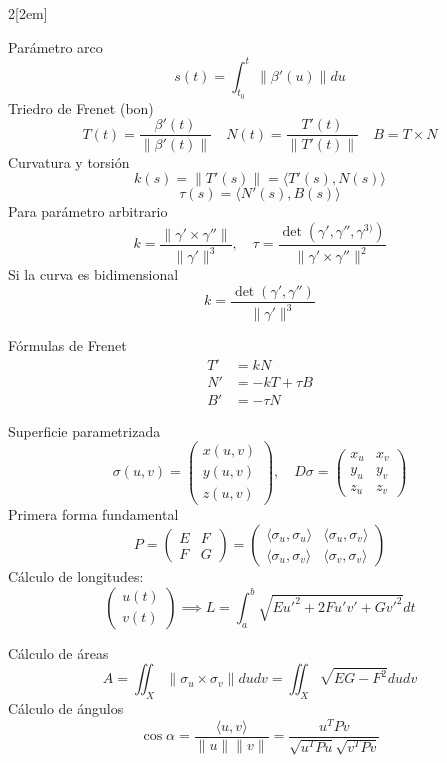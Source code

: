\documentclass[leqno]{article}
\begin{document}
\begin{multicols}{2}[\columnsep2em]

Parámetro arco 
\[
s(t) = \int_{t_0}^t \|\beta' (u)\| du
\]
Triedro de Frenet (bon)
 \[
   T(t) = \frac{\beta'(t)}{\|\beta'(t)\|} \quad N(t) =
\frac{T'(t)}{\|T'(t)\|} \quad
B = T\times N
\] 
Curvatura y torsión
 \[
k(s) = \|T'(s)\|= \langle T'(s) , N(s) \rangle
\]
\[
  \tau(s) = \langle N'(s) , B(s) \rangle 
\]
Para parámetro arbitrario
\[
k = \frac{\|\gamma' \times \gamma''\|}{\|\gamma'\|^3}, \quad \tau = \frac{\det\left( \gamma', \gamma'', \gamma^{3)} \right) }{\|\gamma'\times \gamma''\|^2}
\]
Si la curva es bidimensional
\[
k = \frac{\det(\gamma',\gamma'')}{\|\gamma'\|^3}
\] 

Fórmulas de Frenet
\begin{align*}
  T' &= kN \\
  N' &= -kT + \tau B \\
  B' &= -\tau N 
\end{align*}

Superficie parametrizada
\[
\sigma(u, v) = \begin{pmatrix} x(u, v) \\ y(u, v) \\ z(u, v) \end{pmatrix}, \quad D\sigma = \begin{pmatrix} x_u & x_v \\ y_u & y_v \\ z_u & z_v \end{pmatrix}
\]
Primera forma fundamental
\[
P =   \begin{pmatrix} E & F \\ F & G \end{pmatrix} = \begin{pmatrix} \langle \sigma_u , \sigma_u \rangle & \langle \sigma_u , \sigma_v \rangle \\ \langle \sigma_u , \sigma_v \rangle & \langle \sigma_v , \sigma_v \rangle   \end{pmatrix} 
\]
Cálculo de longitudes:
\[
\begin{pmatrix} u(t)  \\ v(t) \end{pmatrix} \implies   L = \int_a^b \sqrt{Eu'^2 + 2Fu'v' + Gv'^2}dt
\] 

Cálculo de áreas
\[
A = \iint_X\|\sigma _u\times \sigma _v\|dudv=  \iint_X \sqrt{EG-F^2}dudv
\]
Cálculo de ángulos
\[
\cos \alpha  = \frac{\langle u, v \rangle }{\|u\|\|v\|} = \frac{u^TPv}{\sqrt{u^TPu}\sqrt{v^TPv}  }
\] 


\end{multicols}
\end{document}
